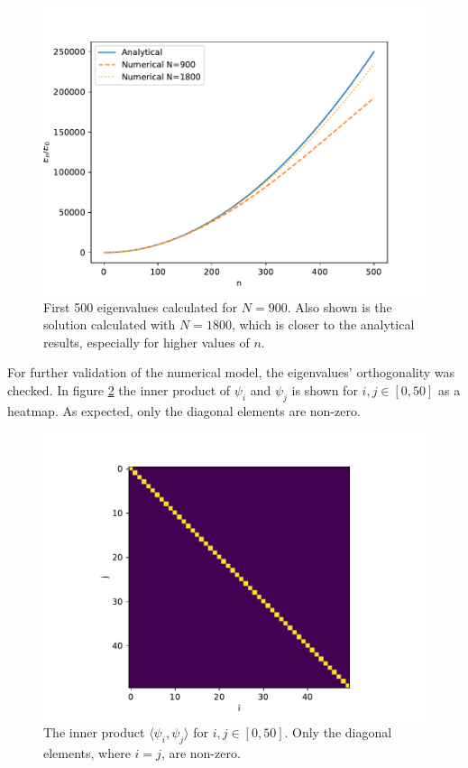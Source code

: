 \documentclass[a4paper, 11pt]{article}
\newcommand{\inner}[2]{\langle #1, #2 \rangle}
\begin{document}
\begin{figure}[ht]
\centering
\includegraphics[width=.5\textwidth]{media/eigenvalues_error}
\caption{First 500 eigenvalues calculated for $N=900$.
Also shown is the solution calculated with $N=1800$, which is closer to the analytical results, especially for higher values of $n$.\label{fig:eigenvalues_to_anal}}
\end{figure}

For further validation of the numerical model, the eigenvalues' orthogonality was checked.
In figure \ref{fig:orthogonal} the inner product of $\psi_i$ and $\psi_j$ is shown for $i,j \in [0, 50]$ as a heatmap.
As expected, only the diagonal elements are non-zero.

\begin{figure}[ht]
\centering
\includegraphics[width=.5\textwidth]{media/orthogonal.pdf}
\caption{The inner product $\inner{\psi_i}{\psi_j}$ for $i,j \in [0, 50]$. Only the diagonal elements, where $i=j$, are non-zero. \label{fig:orthogonal}}
\end{figure}
\end{document}
